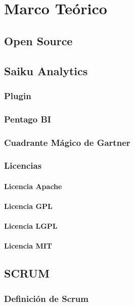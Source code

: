 \chapter{Marco Teórico} \label{chapter:II}
\section{Open Source}
		\lipsum[1-2]
\section{Saiku Analytics}
	\subsection{Plugin}
			\lipsum[1-2]
	\subsection{Pentago BI}
			\lipsum[1-2]
	\subsection{Cuadrante M\'{a}gico de Gartner}
			\lipsum[1-2]
	\subsection{Licencias}
			\lipsum[1-2]
		\subsubsection{Licencia Apache}
				\lipsum[1-2]
		\subsubsection{Licencia GPL}
				\lipsum[1-2]
		\subsubsection{Licencia LGPL}
				\lipsum[1-2]
		\subsubsection{Licencia MIT}
				\lipsum[1-2]
\section{SCRUM}
	\subsection{Definici\'{o}n de Scrum}

